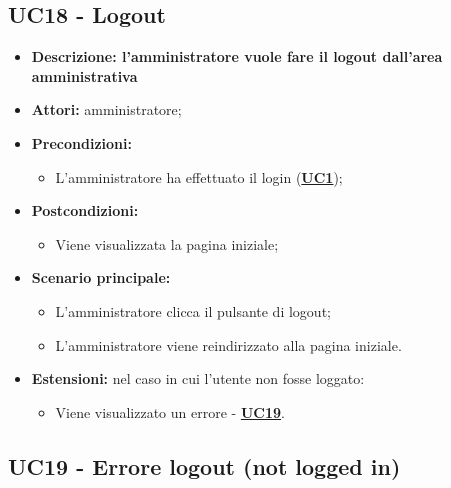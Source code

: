 \documentclass[5pt]{article}
\begin{document}
\subsection{UC18 - Logout}
\label{sec:UC18}
\begin{itemize}
	\item \textbf{Descrizione: l'amministratore vuole fare il logout dall'area amministrativa} 
	\item \textbf{Attori:} amministratore;
	\item \textbf{Precondizioni:} 
	\begin{itemize}
		\item L’amministratore ha effettuato il login (\hyperref[sec:UC1]{\textbf{UC1}});
	\end{itemize}
	\item \textbf{Postcondizioni:} 
	\begin{itemize}
		\item Viene visualizzata la pagina iniziale;
	\end{itemize}
	\item \textbf{Scenario principale:} 
	\begin{itemize}
		\item L’amministratore clicca il pulsante di logout;
		\item L’amministratore viene reindirizzato alla pagina iniziale.
	\end{itemize}
	\item \textbf{Estensioni:} nel caso in cui l'utente non fosse loggato:
	\begin{itemize}
		\item Viene visualizzato un errore - \hyperref[sec:UC19]{\textbf{UC19}}.
	\end{itemize}
\end{itemize}

\subsection{UC19 - Errore logout (not logged in)}
\label{sec:UC19}
\end{document}
